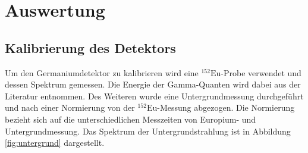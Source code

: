 \section{Auswertung}
\label{sec:Auswertung}

      


\subsection{Kalibrierung des Detektors} \label{sec:kalibrierung}
Um den Germaniumdetektor zu kalibrieren wird eine $^{152}\text{Eu}$-Probe verwendet und dessen Spektrum gemessen.
Die Energie der Gamma-Quanten wird dabei aus der Literatur entnommen. 
Des Weiteren wurde eine Untergrundmessung durchgeführt und nach einer Normierung von der $^{152}\text{Eu}$-Messung abgezogen.
Die Normierung bezieht sich auf die unterschiedlichen Messzeiten von Europium- und Untergrundmessung.
Das Spektrum der Untergrundstrahlung ist in Abbildung \ref{fig:untergrund} dargestellt.

